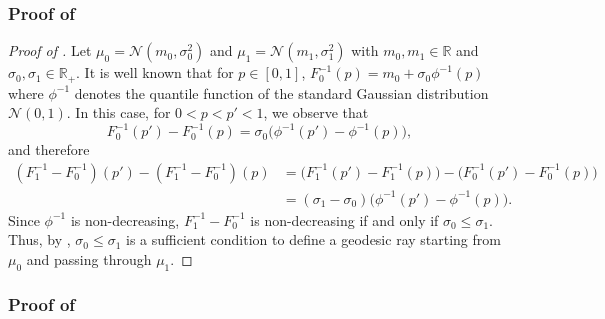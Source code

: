 \documentclass[twoside]{article}
\begin{document}
\subsubsection{Proof of } \label{proof:corr_1d_gaussian_geod}

\begin{proof}[Proof of ]
    Let $\mu_0=\mathcal{N}(m_0,\sigma_0^2)$ and $\mu_1=\mathcal{N}(m_1, \sigma_1^2)$ with $m_0,m_1\in\mathbb{R}$ and $\sigma_0,\sigma_1\in\mathbb{R}_+$. It is well known that for $p\in [0,1]$, $F_{0}^{-1}(p) = m_0 + \sigma_0 \phi^{-1}(p)$ where $\phi^{-1}$ denotes the quantile function of the standard Gaussian distribution $\mathcal{N}(0,1)$. In this case, for $0<p<p'<1$, we observe that 
    \begin{equation}
        F_0^{-1}(p')-F_0^{-1}(p) = \sigma_0 \big(\phi^{-1}(p')-\phi^{-1}(p)\big),
    \end{equation}
    and therefore
    \begin{equation}
        \begin{aligned}
            (F_1^{-1}-F_0^{-1})(p') - (F_1^{-1}-F_0^{-1})(p) &= \big(F_1^{-1}(p')-F_1^{-1}(p)\big)-\big(F_0^{-1}(p')-F_0^{-1}(p)\big) \\
             &= (\sigma_1-\sigma_0)\big(\phi^{-1}(p')-\phi^{-1}(p)\big).
        \end{aligned}
    \end{equation}
    Since $\phi^{-1}$ is non-decreasing, $F_1^{-1}-F_0^{-1}$ is non-decreasing if and only if $\sigma_0\le \sigma_1$. Thus, by , $\sigma_0\le\sigma_1$ is a sufficient condition to define a geodesic ray starting from $\mu_0$ and passing through $\mu_1$.
\end{proof}


\subsubsection{Proof of } \label{proof:corr_gaussian_geod}
\end{document}

